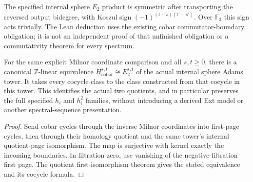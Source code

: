 \begin{proposition}
  \label{prop:internal-sphere-product-graded-commutativity}
  \notready
  The specified internal sphere $E_2$ product is symmetric after transporting
  the reversed output bidegree, with Koszul sign
  $(-1)^{(t-s)(t'-s')}$. Over $\mathbb F_2$ this sign acts trivially.
  The Lean deduction uses the existing cobar commutator-boundary obligation;
  it is not an independent proof of that unfinished obligation or a
  commutativity theorem for every spectrum.
\end{proposition}


\begin{proposition}
  \label{prop:milnor-cobar-internal-e2}
  \leanok
  For the same explicit Milnor coordinate comparison and all $s,t\ge0$,
  there is a canonical $\mathbb Z$-linear equivalence
  $H^{s,t}_{\mathrm{cobar}}\cong E_2^{s,t}$ of the actual internal sphere
  Adams tower. It takes every cocycle class to the class constructed from
  that cocycle in this tower. This identifies the actual two quotients,
  and in particular preserves the full specified $h_i$ and $h_i^2$ families,
  without introducing a derived Ext model or another spectral-sequence
  presentation.
\end{proposition}
\begin{proof}
  Send cobar cycles through the inverse Milnor coordinates into first-page
  cycles, then through their homology quotient and the same tower's
  internal quotient-page isomorphism. The map is surjective with kernel
  exactly the incoming boundaries. In filtration zero, use vanishing of
  the negative-filtration first page. The quotient first-isomorphism
  theorem gives the stated equivalence and its cocycle formula.
  \leanok
\end{proof}

